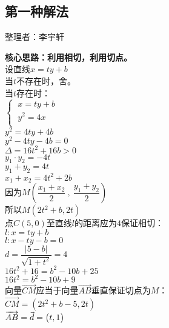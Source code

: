 \documentclass[UTF8]{ctexart}
\let\nvec\vec
\def\vec#1{\nvec{\vphantom b\smash{#1}}}
\begin{document}
\newpage

\subsection{第一种解法}
    \begin{center}
        整理者：李宇轩
    \end{center}
    \begin{multicols}{2}
        \small
        \textbf{核心思路：利用相切，利用切点。}\\[5mm]
        设直线$x=ty+b$\\[5mm]
        当$t$不存在时，舍。\\[5mm]
        当$t$存在时：\\[5mm]
        \begin{math}
            \begin{cases}
                ~x=ty+b\\[1mm]
                ~y^2=4x\\[1mm]
            \end{cases}
        \end{math}\\[5mm]
        $y^2=4ty+4b$\\[5mm]
        $y^2-4ty-4b=0$\\[5mm]
        $\Delta=16t^2+16b>0$\\[5mm]
        $y_1\cdot y_2=-4t$\\[5mm]
        $y_1+y_2=4t$\\[5mm]
        $x_1+x_2=4t^2+2b$\\[5mm]
        因为$M\left(\dfrac{x_1+x_2}{2}~,~\dfrac{y_1+y_2}{2}\right)$\\[5mm]
        所以$M\left(2t^2+b,2t\right)$\\[8mm]
        点$C(5,0)$至直线$l$的距离应为$4$保证相切：\\[5mm]
        $l:x=ty+b$\\[5mm]
        $l:x-ty-b=0$\\[5mm]
        $d=\dfrac{|5-b|}{\sqrt{1+t^2}}=4$\\[5mm]
        $16t^2+16=b^2-10b+25$\\[5mm]
        $16t^2=b^2-10b+9$\\[50mm]
        向量$\overrightarrow{CM}$应当于向量$\overrightarrow{AB}$垂直保证切点为$M$：\\[5mm]
        $\overrightarrow{CM}=\left(2t^2+b-5,2t\right)$\\[5mm]
        $\overrightarrow{AB}=\vec{d}=\big(t,1\big)$\\[5mm]

\end{multicols}
\end{document}
